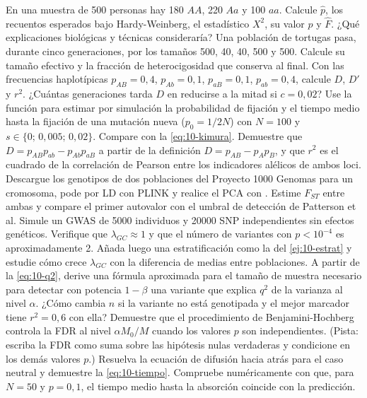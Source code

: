 \begin{ejercicios}
 En una muestra de 500 personas hay 180 $AA$, 220 $Aa$ y 100 $aa$. Calcule $\hat p$, los recuentos esperados bajo Hardy-Weinberg, el estadístico $X^2$, su valor $p$ y $\hat F$. ¿Qué explicaciones biológicas y técnicas consideraría?
 Una población de tortugas pasa, durante cinco generaciones, por los tamaños 500, 40, 40, 500 y 500. Calcule su tamaño efectivo y la fracción de heterocigosidad que conserva al final.
 Con las frecuencias haplotípicas $p_{AB}=0{,}4$, $p_{Ab}=0{,}1$, $p_{aB}=0{,}1$, $p_{ab}=0{,}4$, calcule $D$, $D'$ y $r^2$. ¿Cuántas generaciones tarda $D$ en reducirse a la mitad si $c=0{,}02$?
 Use la función  para estimar por simulación la probabilidad de fijación y el tiempo medio hasta la fijación de una mutación nueva ($p_0=1/2N$) con $N=100$ y $s\in\{0;\,0{,}005;\,0{,}02\}$. Compare con la \cref{eq:10-kimura}.
 Demuestre que $D=p_{AB}p_{ab}-p_{Ab}p_{aB}$ a partir de la definición $D=p_{AB}-p_Ap_B$, y que $r^2$ es el cuadrado de la correlación de Pearson entre los indicadores alélicos de ambos loci.
 Descargue los genotipos de dos poblaciones del Proyecto 1000 Genomas para un cromosoma, pode por LD con PLINK y realice el PCA con . Estime $F_{ST}$ entre ambas y compare el primer autovalor con el umbral de detección de Patterson et al.
 Simule un GWAS de \num{5000} individuos y \num{20000} SNP independientes sin efectos genéticos. Verifique que $\lambda_{GC}\approx1$ y que el número de variantes con $p<10^{-4}$ es aproximadamente 2. Añada luego una estratificación como la del \cref{ej:10-estrat} y estudie cómo crece $\lambda_{GC}$ con la diferencia de medias entre poblaciones.
 A partir de la \cref{eq:10-q2}, derive una fórmula aproximada para el tamaño de muestra necesario para detectar con potencia $1-\beta$ una variante que explica $q^2$ de la varianza al nivel $\alpha$. ¿Cómo cambia $n$ si la variante no está genotipada y el mejor marcador tiene $r^2=0{,}6$ con ella?
 Demuestre que el procedimiento de Benjamini-Hochberg controla la FDR al nivel $\alpha M_0/M$ cuando los valores $p$ son independientes. (Pista: escriba la FDR como suma sobre las hipótesis nulas verdaderas y condicione en los demás valores $p$.)
 Resuelva la ecuación de difusión hacia atrás para el caso neutral y demuestre la \cref{eq:10-tiempo}. Compruebe numéricamente con  que, para $N=50$ y $p=0{,}1$, el tiempo medio hasta la absorción coincide con la predicción.
\end{ejercicios}

